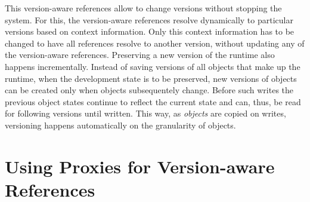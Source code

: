 This version-aware references allow to change versions without stopping the system.
For this, the version-aware references resolve dynamically to particular versions based on context information.
Only this context information has to be changed to have all references resolve to another version, without updating any of the version-aware references.
Preserving a new version of the runtime also happens incrementally.
Instead of saving versions of all objects that make up the runtime, when the development state is to be preserved, new versions of objects can be created only when objects subsequentely change.
Before such writes the previous object states continue to reflect the current state and can, thus, be read for following versions until written.
This way, as \emph{objects} are copied on writes, versioning happens automatically on the granularity of objects.
















\section{Using Proxies for Version-aware References} \label{sec:APPROACH:2}






